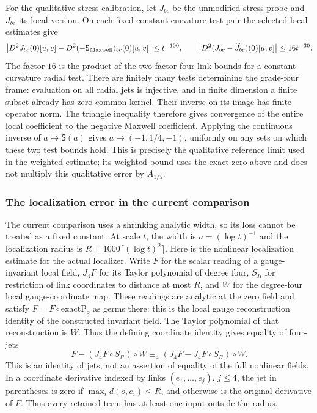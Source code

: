 For the qualitative stress calibration, let $J_{bc}$ be the unmodified
stress probe and $\widetilde J_{bc}$ its local version. On each fixed
constant-curvature test pair the selected local estimates give
\[
 \big|D^2J_{bc}(0)[u,v]-D^2(-\mathsf S_{\rm Maxwell})_{bc}(0)[u,v]\big|
 \le t^{-100},\qquad
 \big|D^2(J_{bc}-\widetilde J_{bc})(0)[u,v]\big|
 \le16t^{-30}.
\]
The factor $16$ is the product of the two factor-four link bounds for a
constant-curvature radial test. There are finitely many tests determining
the grade-four frame: evaluation on all radial jets is injective, and in
finite dimension a finite subset already has zero common kernel.
Their inverse on its image has finite operator norm. The triangle
inequality therefore gives convergence of the entire local coefficient
to the negative Maxwell coefficient. Applying the continuous inverse of
$a\mapsto\mathsf S(a)$ gives $a\to(-1,1/4,-1)$, uniformly on any sets on
which these two test bounds hold. This is precisely the qualitative
reference limit used in the weighted estimate; its weighted bound uses
the exact zero above and does not multiply this qualitative error by
$A_{1/5}$.

\subsubsection{The localization error in the current comparison}
\label{subsec:trace-charge-localization}

The current comparison uses a shrinking analytic width, so its loss
cannot be treated as a fixed constant. At scale $t$, the width is
$a=(\log t)^{-1}$ and the localization radius is
$R=1000\lceil(\log t)^2\rceil$. Here is the nonlinear localization estimate for the actual localizer.
Write $F$ for the scalar reading of a gauge-invariant local field, $J_4F$
for its Taylor polynomial of degree four, $S_R$ for restriction of link
coordinates to distance at most $R$, and $W$ for the degree-four local
gauge-coordinate map. These readings are analytic at the zero field and
satisfy $F=F\circ\mathrm{exactP}_o$ as germs there: this is the local
gauge reconstruction identity of the constructed invariant field.
The Taylor polynomial of that reconstruction is $W$. Thus the defining
coordinate identity gives equality of four-jets
\[
 F-(J_4F\circ S_R)\circ W
       \equiv_4 (J_4F-J_4F\circ S_R)\circ W.
\]
This is an identity of jets, not an assertion of equality of the full
nonlinear fields. In a coordinate derivative indexed by links
$(e_1,\ldots,e_j)$, $j\le4$, the jet in parentheses is zero if
$\max_i d(o,e_i)\le R$, and otherwise is the original derivative of $F$.
Thus every retained term has at least one input outside the radius.


